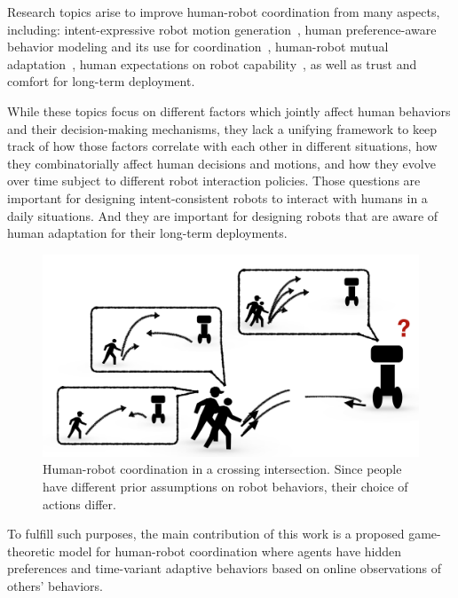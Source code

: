 \documentclass[letterpaper, 10 pt, conference]{ieeeconf}  %
\begin{document}
Research topics arise 
to improve human-robot coordination from many aspects, including: intent-expressive robot 
motion generation~\cite{dragan2013legibility,lichtenthaler2012influence}, human 
preference-aware behavior modeling and its 
use for coordination~\cite{gombolay2015coordination,dorsa2017active}, human-robot mutual 
adaptation~\cite{nikolaidis2013human,nikolaidis2016formalizing}, human 
expectations on robot capability~\cite{cha2015perceived,kwon2016human}, as well as trust and comfort for long-term 
deployment\cite{yang2017evaluating}. 

While these topics focus on different factors which jointly affect human behaviors and 
their decision-making mechanisms, 
they lack a unifying framework to keep track of how those factors correlate with 
each other in different situations, how they combinatorially affect human 
decisions and motions, and 
how they evolve over time subject to different robot interaction policies. 
Those questions are important for designing intent-consistent robots to 
interact with humans in a daily situations. And they are important for 
designing 
robots that are aware of human 
adaptation for their long-term deployments.  

   \begin{figure}[t]\label{fig:intro}
      \centering
      \vspace{-1em}
      \includegraphics[scale=0.32]{intro}
      \vspace{-1.5em}
      \caption{Human-robot coordination in a crossing intersection. Since 
      people have different prior assumptions on robot behaviors, their choice 
      of actions differ.}
      \vspace{-2em}
   \end{figure}
To fulfill such purposes, the main contribution of this work is a proposed game-theoretic 
model for human-robot coordination where agents have hidden preferences and time-variant adaptive behaviors based 
on online observations of others' behaviors.
\end{document}

